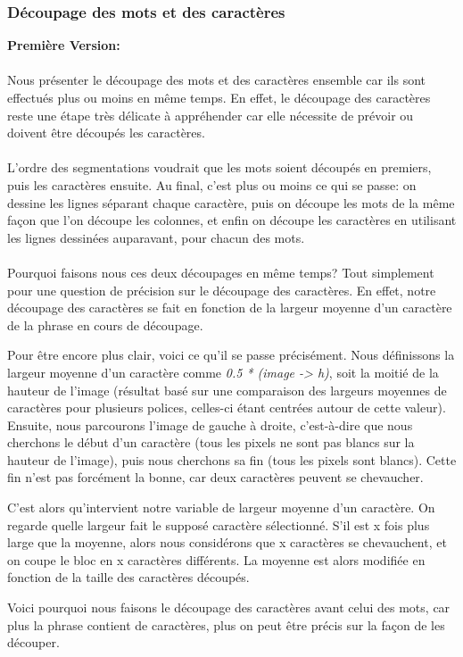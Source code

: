 \documentclass{article}
\begin{document}
    \subsubsection{Découpage des mots et des caractères}
    \textbf{Première Version:}
	\paragraph{}
	Nous présenter le découpage des mots et des caractères ensemble car ils sont effectués plus ou moins en même temps. En effet, le découpage des caractères reste une étape très délicate à appréhender car elle nécessite de prévoir ou doivent être découpés les caractères.
	
	\paragraph{}
	L'ordre des segmentations voudrait que les mots soient découpés en premiers, puis les caractères ensuite. Au final, c'est plus ou moins ce qui se passe: on dessine les lignes séparant chaque caractère, puis on découpe les mots de la même façon que l'on découpe les colonnes, et enfin on découpe les caractères en utilisant les lignes dessinées auparavant, pour chacun des mots.
	
	\paragraph{}
	Pourquoi faisons nous ces deux découpages en même temps? Tout simplement pour une question de précision sur le découpage des caractères. En effet, notre découpage des caractères se fait en fonction de la largeur moyenne d'un caractère de la phrase en cours de découpage.
	\par Pour être encore plus clair, voici ce qu'il se passe précisément. Nous définissons la largeur moyenne d'un caractère comme \textit{0.5 * (image -> h)}, soit la moitié de la hauteur de l'image (résultat basé sur une comparaison des largeurs moyennes de caractères pour plusieurs polices, celles-ci étant centrées autour de cette valeur). Ensuite, nous parcourons l'image de gauche à droite, c'est-à-dire que nous cherchons le début d'un caractère (tous les pixels ne sont pas blancs sur la hauteur de l'image), puis nous cherchons sa fin (tous les pixels sont blancs). Cette fin n'est pas forcément la bonne, car deux caractères peuvent se chevaucher.
	\par C'est alors qu'intervient notre variable de largeur moyenne d'un caractère. On regarde quelle largeur fait le supposé caractère sélectionné. S'il est x fois plus large que la moyenne, alors nous considérons que x caractères se chevauchent, et on coupe le bloc en x caractères différents. La moyenne est alors modifiée en fonction de la taille des caractères découpés.
	\par Voici pourquoi nous faisons le découpage des caractères avant celui des mots, car plus la phrase contient de caractères, plus on peut être précis sur la façon de les découper.
	
\end{document}
